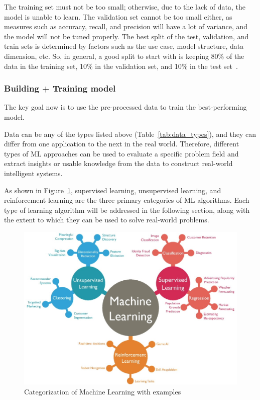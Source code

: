 The training set must not be too small; otherwise, due to the lack of data, the model is unable to learn. The validation set cannot be too small either, as measures such as accuracy, recall, and precision will have a lot of variance, and the model will not be tuned properly. The best split of the test, validation, and train sets is determined by factors such as the use case, model structure, data dimension, etc. So, in general, a good split to start with is keeping 80\% of the data in the training set, 10\% in the validation set, and 10\% in the test set~\cite{Baheti2021TrainData}.

\subsubsection{Building + Training model}

The key goal now is to use the pre-processed data to train the best-performing model.

Data can be any of the types listed above (Table~\ref{tab:data_types}), and they can differ from one application to the next in the real world. Therefore, different types of \gls{ML} approaches can be used to evaluate a specific problem field and extract insights or usable knowledge from the data to construct real-world intelligent systems.

As shown in Figure~\ref{fig:categorization_ML}, supervised learning, unsupervised learning, and reinforcement learning are the three primary categories of \gls{ML} algorithms. Each type of learning algorithm will be addressed in the following section, along with the extent to which they can be used to solve real-world problems.

\begin{figure}[htbp]
    \centering
    \includegraphics[width=0.75\linewidth]{Chapters/Figures/categorization_ML.jpeg}
    \caption{Categorization of Machine Learning with examples~\cite{Chugh2018TypesKnow}}
    \label{fig:categorization_ML}
\end{figure}

